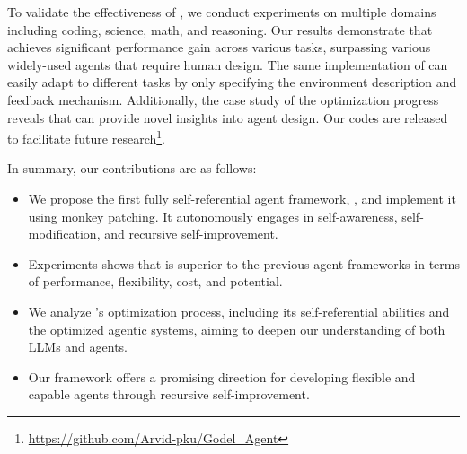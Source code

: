 To validate the effectiveness of \framework, we conduct experiments on multiple domains including coding, science, math, and reasoning. Our results demonstrate that \framework achieves significant performance gain across various tasks, surpassing various widely-used agents that require human design. The same implementation of \framework can easily adapt to different tasks by only specifying the environment description and feedback mechanism. Additionally, the case study of the optimization progress reveals that \framework can provide novel insights into agent design. Our codes are released to facilitate future research\footnote{\href{https://github.com/Arvid-pku/Godel\_Agent}{https://github.com/Arvid-pku/Godel\_Agent}}. 


In summary, our contributions are as follows:
\vspace{-7pt}
\begin{itemize}[leftmargin=*,itemsep=1pt]
    \item We propose the first fully self-referential agent framework, \framework, and implement it using monkey patching. It autonomously engages in self-awareness, self-modification, and recursive self-improvement.
    \item Experiments shows that \framework{} is superior to the previous agent frameworks in terms of performance, flexibility, cost, and potential.
    \item We analyze \framework’s optimization process, including its self-referential abilities and the optimized agentic systems, aiming to deepen our understanding of both LLMs and agents.
    \item Our framework offers a promising direction for developing flexible and capable agents through recursive self-improvement.
\end{itemize}
